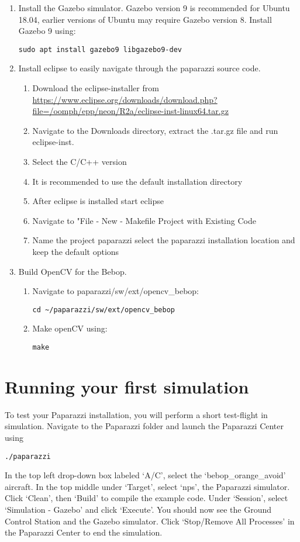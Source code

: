 \documentclass{article}
\begin{document}
\begin{enumerate}
{{}
}
\item{Install the Gazebo simulator. Gazebo version 9 is recommended for Ubuntu 18.04, earlier versions of Ubuntu may require Gazebo version 8. Install Gazebo 9 using:
\begin{lstlisting}[style=Bash]
sudo apt install gazebo9 libgazebo9-dev
\end{lstlisting}
}
\item{Install eclipse to easily navigate through the paparazzi source code.
\begin{enumerate}
\item{Download the eclipse-installer from \url{https://www.eclipse.org/downloads/download.php?file=/oomph/epp/neon/R2a/eclipse-inst-linux64.tar.gz}}
\item{Navigate to the Downloads directory, extract the .tar.gz file and run eclipse-inst.}
\item{Select the C/C++ version}
\item{It is recommended to use the default installation directory}
\item{After eclipse is installed start eclipse}
\item{Navigate to "File - New - Makefile Project with Existing Code}
\item{Name the project paparazzi select the paparazzi installation location and keep the default options}
\end{enumerate}
}
\item{Build OpenCV for the Bebop.
\begin{enumerate}
\item{Navigate to paparazzi/sw/ext/opencv\_bebop:
\begin{lstlisting}[style=Bash]
cd ~/paparazzi/sw/ext/opencv_bebop
\end{lstlisting}}
\item{Make openCV using:
\begin{lstlisting}[style=Bash]
make
\end{lstlisting}}
\end{enumerate}
}
\end{enumerate}


\section{Running your first simulation}
To test your Paparazzi installation, you will perform a short test-flight in simulation.
Navigate to the Paparazzi folder and launch the Paparazzi Center using
\begin{lstlisting}[style=Bash]
./paparazzi
\end{lstlisting}
In the top left drop-down box labeled `A/C', select the `bebop\_orange\_avoid' aircraft.
In the top middle under `Target', select `nps', the Paparazzi simulator.
Click `Clean', then `Build' to compile the example code.
Under `Session', select `Simulation - Gazebo' and click `Execute'. You should now see the Ground Control Station and the Gazebo simulator.
Click `Stop/Remove All Processes' in the Paparazzi Center to end the simulation.
\end{document}
